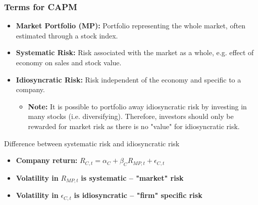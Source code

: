     \subsubsection{Terms for CAPM}
    \begin{terminology}
        \begin{itemize}
            \item \textbf{Market Portfolio (MP):} Portfolio representing the whole market, often estimated through a stock index.
        
            \item \textbf{Systematic Risk:} Risk associated with the market as a whole, e.g. effect of economy on sales and stock value.
            
            \item \textbf{Idiosyncratic Risk:} Risk independent of the economy and specific to a company.
            \begin{itemize}
                \item \textbf{Note:} It is possible to portfolio away idiosyncratic risk by investing in many stocks (i.e. diversifying). Therefore, investors should only be rewarded for market risk as there is no "value" for idiosyncratic risk.
            \end{itemize}
        \end{itemize}
    \end{terminology}

    \begin{example}
        Difference between systematic risk and idiosyncratic risk 

        \begin{itemize}
            \item \textbf{Company return:} \( R_{C,t} = \alpha_C + \beta_C R_{MP,t} + \epsilon_{C,t} \)
            \item \textbf{Volatility in} \( R_{MP,t} \) \textbf{is systematic – "market" risk}
            \item \textbf{Volatility in} \( \epsilon_{C,t} \) \textbf{is idiosyncratic – "firm" specific risk}
        \end{itemize}
    \end{example}

